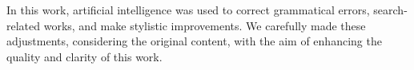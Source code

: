 In this work, artificial intelligence was used to correct grammatical errors, search-related works, and make stylistic improvements. We carefully made these adjustments, considering the original content, with the aim of enhancing the quality and clarity of this work.